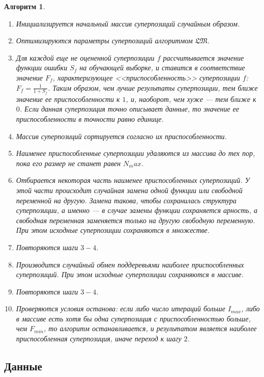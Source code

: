 \documentclass[12pt,a4paper]{amsart}
\newtheorem{algo}{Алгоритм}
\begin{document}
\begin{algo}
  \begin{enumerate}
	\item Инициализируется начальный массив суперпозиций случайным образом.
	\item Оптимизируются параметры суперпозиций алгоритмом $\mathfrak{LM}$.
	\item Для каждой еще не оцененной суперпозиции $f$ рассчитывается значение
	  функции ошибки $S_f$ на обучающей выборке, и ставится в соответствие
	  значение $F_f$, характеризующее <<приспособленность>> суперпозиции $f$:
	  $F_f = \frac{1}{1 + S_f}$. Таким образом, чем лучше результаты суперпозиции,
	  тем ближе значение ее приспособленности к $1$, и, наоборот, чем хуже ---
	  тем ближе к $0$. Если данная суперпозиция точно описывает данные, то
	  значение ее приспособленности в точности равно единице.
	\item Массив суперпозиций сортируется согласно их приспособленности.
	\item Наименее приспособленные суперпозиции удаляются из массива до тех
	  пор, пока его размер не станет равен $N_max$.
	\item Отбирается некоторая часть наименее приспособленных суперпозиций.
	  У этой части происходит случайная замена одной функции или свободной
	  переменной на другую. Замена такова, чтобы сохранилась структура
	  суперпозиции, а именно --- в случае замены функции сохраняется арность,
	  а свободная переменная заменяется только на другую свободную переменную.
	  При этом исходные суперпозиции сохраняются в множестве.
	\item Повторяются шаги $3-4$.
	\item Производится случайный обмен поддеревьями наиболее приспособленных
	  суперпозиций. При этом исходные суперпозиции сохраняются в массиве.
	\item Повторяются шаги $3-4$.
	\item Проверяются условия останова: если либо число итераций больше
	  $I_{max}$, либо в массиве есть хотя бы одна суперпозиция с
	  приспособленностью больше, чем $F_{min}$, то алгоритм останавливается,
	  и результатом является наиболее приспособленная суперпозиция, иначе
	  переход к шагу $2$.
  \end{enumerate}
\end{algo}

\subsection{Данные}
\end{document}
